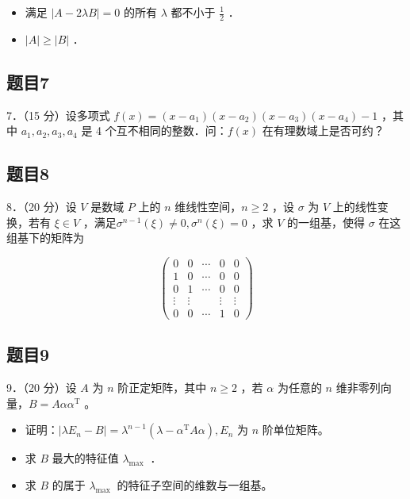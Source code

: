 \documentclass{article}
\begin{document}
\begin{itemize}
  \item[（1）] 满足 \(|A-2 \lambda B|=0\) 的所有 \(\lambda\) 都不小于 \(\frac{1}{2}\) ．
  \item[（2）] \(|A| \geq|B|\) ．
\end{itemize}

\subsection{题目7}
7．（15 分）设多项式 \(f(x)=\left(x-a_{1}\right)\left(x-a_{2}\right)\left(x-a_{3}\right)\left(x-a_{4}\right)-1\) ，其中 \(a_{1}, a_{2}, a_{3}, a_{4}\) 是 4 个互不相同的整数．问：\(f(x)\) 在有理数域上是否可约？

\subsection{题目8}
8．（20 分）设 \(V\) 是数域 \(P\) 上的 \(n\) 维线性空间，\(n \geq 2\) ，设 \(\sigma\) 为 \(V\) 上的线性变换，若有 \(\xi \in V\) ，满足\(\sigma^{n-1}(\xi) \neq 0, \sigma^{n}(\xi)=0\) ，求 \(V\) 的一组基，使得 \(\sigma\) 在这组基下的矩阵为

\[
\left(\begin{array}{ccccc}
0 & 0 & \cdots & 0 & 0 \\
1 & 0 & \cdots & 0 & 0 \\
0 & 1 & \cdots & 0 & 0 \\
\vdots & \vdots & & \vdots & \vdots \\
0 & 0 & \cdots & 1 & 0
\end{array}\right)
\]

\subsection{题目9}
9．（20 分）设 \(A\) 为 \(n\) 阶正定矩阵，其中 \(n \geq 2\) ，若 \(\alpha\) 为任意的 \(n\) 维非零列向量，\(B=A \alpha \alpha^{\mathrm{T}}\) 。

\begin{itemize}
  \item[（1）] 证明：\(\left|\lambda E_{n}-B\right|=\lambda^{n-1}\left(\lambda-\alpha^{\mathrm{T}} A \alpha\right), E_{n}\) 为 \(n\) 阶单位矩阵。
  \item[（2）] 求 \(B\) 最大的特征值 \(\lambda_{\text {max }}\) ．
  \item[（3）] 求 \(B\) 的属于 \(\lambda_{\text {max }}\) 的特征子空间的维数与一组基。
\end{itemize}
\end{document}
